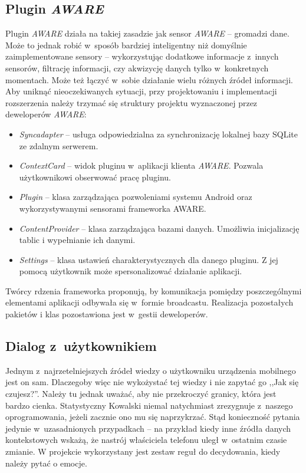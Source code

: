 \subsection{Plugin \textit{AWARE}}

Plugin \textit{AWARE} działa na takiej zasadzie jak sensor \textit{AWARE} -- gromadzi dane. Może to jednak robić w~sposób bardziej inteligentny niż domyślnie zaimplementowane sensory -- wykorzystując dodatkowe informacje z~innych sensorów, filtrację informacji, czy akwizycję danych tylko w~konkretnych momentach. Może też łączyć w~sobie działanie wielu różnych źródeł informacji. Aby uniknąć nieoczekiwanych sytuacji, przy projektowaniu i implementacji rozszerzenia należy trzymać się struktury projektu wyznaczonej przez deweloperów \textit{AWARE}:

\begin{itemize}
	\item \textit{Syncadapter} -- usługa odpowiedzialna za synchronizację lokalnej bazy SQLite ze zdalnym serwerem.
	
	\item \textit{ContextCard} -- widok pluginu w~aplikacji klienta \textit{AWARE}. Pozwala użytkownikowi obserwować pracę pluginu.
	
	\item \textit{Plugin} -- klasa zarządzająca pozwoleniami systemu Android oraz wykorzystywanymi sensorami frameworka AWARE.
	
	\item \textit{ContentProvider} -- klasa zarządzająca bazami danych. Umożliwia inicjalizację tablic i wypełnianie ich danymi.
	
	\item \textit{Settings} -- klasa ustawień charakterystycznych dla danego pluginu. Z jej pomocą użytkownik może spersonalizować działanie aplikacji.
\end{itemize}

Twórcy rdzenia frameworka proponują, by komunikacja pomiędzy poszczególnymi elementami aplikacji odbywała się w~formie broadcastu. Realizacja pozostałych pakietów i klas pozostawiona jest w~gestii deweloperów\cite{AwareFramework}. 


\subsection{Dialog z~użytkownikiem}

Jednym z~najrzetelniejszych źródeł wiedzy o użytkowniku urządzenia mobilnego jest on sam. Dlaczegoby więc nie wykożystać tej wiedzy i nie zapytać go ,,Jak się czujesz?''. Należy tu jednak uważać, aby nie przekroczyć granicy, która jest bardzo cienka. Statystyczny Kowalski niemal natychmiast zrezygnuje z~naszego oprogramowania, jeżeli zacznie ono mu się naprzykrzać. Stąd konieczność pytania jedynie w~uzasadnionych przypadkach -- na przykład kiedy inne źródła danych kontekstowych wskażą, że nastrój właściciela telefonu uległ w~ostatnim czasie zmianie. W projekcie wykorzystany jest zestaw reguł do decydowania, kiedy należy pytać o emocje.

